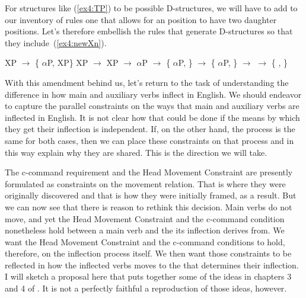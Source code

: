 For structures like (\ref{ex4:TP}) to be possible D-structures, we will have to add to our inventory of  rules one that allows for an  position to have two daughter  positions. Let's therefore embellish the rules that generate D-structures so that they include~(\ref{ex4:newXn}).
\pagebreak
\begin{exe}
	\raggedright
	\ex \label{ex4:newX} 
	\begin{xlist}
		\ex XP $\rightarrow$ \{ $\alpha$P, XP\}
		\ex XP $\rightarrow$ 
		\ex XP $\rightarrow$ $\alpha$P 
		\ex {} $\rightarrow$ \{ $\alpha$P,  \}
		\ex {} $\rightarrow$ \{ $\alpha$P,  \}
		\ex {} $\rightarrow$ 
		\ex \label{ex4:newXn}  $\rightarrow$ \{ \obar{$\alpha$},  \}
	\end{xlist}
\end{exe}

With this amendment behind us, let's return to the task of understanding the difference in how main and auxiliary verbs inflect in English. We should endeavor to capture the parallel constraints on the ways that main and auxiliary verbs are inflected in English. It is not clear how that could be done if the means by which they get their inflection is independent. If, on the other hand, the process is the same for both cases, then we can place these constraints on that process and in this way explain why they are shared. This is the direction we will take.

The c-command requirement and the Head Movement Constraint are presently formulated as constraints on the movement relation. That is where they were originally discovered and that is how they were initially framed, as a result. But we can now see that there is reason to rethink this decision. Main verbs do not move, and yet the Head Movement Constraint and the c-command condition nonetheless hold between a main verb and the  its inflection derives from. We want the Head Movement Constraint and the c-command conditions to hold, therefore, on the inflection process itself. We then want those constraints to be reflected in how the inflected verbs moves to the  that determines their inflection. I will sketch a proposal here that puts together some of the ideas in chapters 3 and 4 of \citet{Chomsky:1995}. It is not a perfectly faithful a reproduction of those ideas, however.%
%
%
%

